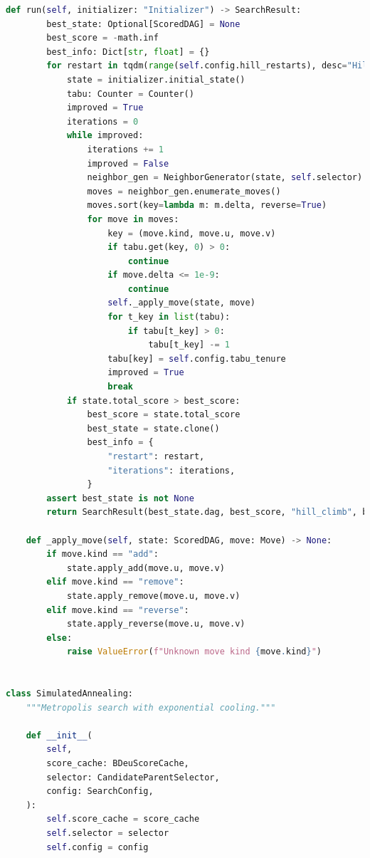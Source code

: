\documentclass[twoside,11pt]{article}
\begin{document}
\begin{algorithm}
\begin{lstlisting}[language=Python]
    def run(self, initializer: "Initializer") -> SearchResult:
        best_state: Optional[ScoredDAG] = None
        best_score = -math.inf
        best_info: Dict[str, float] = {}
        for restart in tqdm(range(self.config.hill_restarts), desc="Hill Climbing Restarts", unit="restart"):
            state = initializer.initial_state()
            tabu: Counter = Counter()
            improved = True
            iterations = 0
            while improved:
                iterations += 1
                improved = False
                neighbor_gen = NeighborGenerator(state, self.selector)
                moves = neighbor_gen.enumerate_moves()
                moves.sort(key=lambda m: m.delta, reverse=True)
                for move in moves:
                    key = (move.kind, move.u, move.v)
                    if tabu.get(key, 0) > 0:
                        continue
                    if move.delta <= 1e-9:
                        continue
                    self._apply_move(state, move)
                    for t_key in list(tabu):
                        if tabu[t_key] > 0:
                            tabu[t_key] -= 1
                    tabu[key] = self.config.tabu_tenure
                    improved = True
                    break
            if state.total_score > best_score:
                best_score = state.total_score
                best_state = state.clone()
                best_info = {
                    "restart": restart,
                    "iterations": iterations,
                }
        assert best_state is not None
        return SearchResult(best_state.dag, best_score, "hill_climb", best_info)

    def _apply_move(self, state: ScoredDAG, move: Move) -> None:
        if move.kind == "add":
            state.apply_add(move.u, move.v)
        elif move.kind == "remove":
            state.apply_remove(move.u, move.v)
        elif move.kind == "reverse":
            state.apply_reverse(move.u, move.v)
        else:
            raise ValueError(f"Unknown move kind {move.kind}")


class SimulatedAnnealing:
    """Metropolis search with exponential cooling."""

    def __init__(
        self,
        score_cache: BDeuScoreCache,
        selector: CandidateParentSelector,
        config: SearchConfig,
    ):
        self.score_cache = score_cache
        self.selector = selector
        self.config = config


\end{lstlisting}
\end{algorithm}
\end{document}
